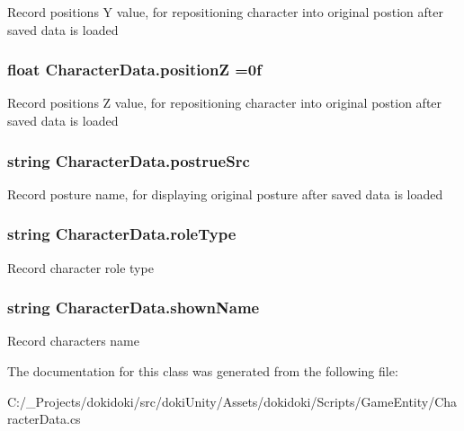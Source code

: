 Record position\textquotesingle{}s Y value, for repositioning character into original postion after saved data is loaded 

\subsubsection[{\texorpdfstring{positionZ}{positionZ}}]{\setlength{\rightskip}{0pt plus 5cm}float Character\+Data.\+positionZ =0f}\hypertarget{class_character_data_a88c4b72ebafe15f4a94efecf4cc234bf}{}\label{class_character_data_a88c4b72ebafe15f4a94efecf4cc234bf}


Record position\textquotesingle{}s Z value, for repositioning character into original postion after saved data is loaded 

\subsubsection[{\texorpdfstring{postrue\+Src}{postrueSrc}}]{\setlength{\rightskip}{0pt plus 5cm}string Character\+Data.\+postrue\+Src}\hypertarget{class_character_data_a82646c36b7e8870ac63de55244bb439f}{}\label{class_character_data_a82646c36b7e8870ac63de55244bb439f}


Record posture name, for displaying original posture after saved data is loaded 

\subsubsection[{\texorpdfstring{role\+Type}{roleType}}]{\setlength{\rightskip}{0pt plus 5cm}string Character\+Data.\+role\+Type}\hypertarget{class_character_data_adff8e0b4b56c8123fb1b95bd8c1df94c}{}\label{class_character_data_adff8e0b4b56c8123fb1b95bd8c1df94c}


Record character role type 

\subsubsection[{\texorpdfstring{shown\+Name}{shownName}}]{\setlength{\rightskip}{0pt plus 5cm}string Character\+Data.\+shown\+Name}\hypertarget{class_character_data_ae229e19f27feb544571c27cb527ed4f4}{}\label{class_character_data_ae229e19f27feb544571c27cb527ed4f4}


Record character\textquotesingle{}s name 



The documentation for this class was generated from the following file\+:\begin{DoxyCompactItemize}
\item 
C\+:/\+\_\+\+Projects/dokidoki/src/doki\+Unity/\+Assets/dokidoki/\+Scripts/\+Game\+Entity/Character\+Data.\+cs\end{DoxyCompactItemize}
